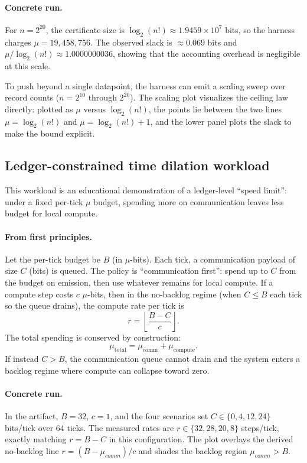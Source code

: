 \paragraph{Concrete run.}
For $n=2^{20}$, the certificate size is $\log_2(n!)\approx 1.9459\times 10^7$ bits, so the harness charges $\mu=19{,}458{,}756$. The observed slack is $\approx 0.069$ bits and $\mu/\log_2(n!)\approx 1.0000000036$, showing that the accounting overhead is negligible at this scale.

To push beyond a single datapoint, the harness can emit a scaling sweep over record counts ($n=2^{10}$ through $2^{20}$). The scaling plot visualizes the ceiling law directly: plotted as $\mu$ versus $\log_2(n!)$, the points lie between the two lines $\mu=\log_2(n!)$ and $\mu=\log_2(n!)+1$, and the lower panel plots the slack to make the bound explicit.


\subsection{Ledger-constrained time dilation workload}
\label{sec:ledger_time_dilation}
This workload is an educational demonstration of a ledger-level ``speed limit'': under a fixed per-tick $\mu$ budget, spending more on communication leaves less budget for local compute.

\paragraph{From first principles.}
Let the per-tick budget be $B$ (in $\mu$-bits). Each tick, a communication payload of size $C$ (bits) is queued. The policy is ``communication first'': spend up to $C$ from the budget on emission, then use whatever remains for local compute. If a compute step costs $c$ $\mu$-bits, then in the no-backlog regime (when $C\le B$ each tick so the queue drains), the compute rate per tick is
\[
r = \left\lfloor\frac{B-C}{c}\right\rfloor.
\]
The total spending is conserved by construction:
\[
\mu_{\text{total}} = \mu_{\text{comm}} + \mu_{\text{compute}}.
\]
If instead $C>B$, the communication queue cannot drain and the system enters a backlog regime where compute can collapse toward zero.

\paragraph{Concrete run.}
In the artifact, $B=32$, $c=1$, and the four scenarios set $C\in\{0,4,12,24\}$ bits/tick over 64 ticks. The measured rates are $r\in\{32,28,20,8\}$ steps/tick, exactly matching $r=B-C$ in this configuration. The plot overlays the derived no-backlog line $r=(B-\mu_{comm})/c$ and shades the backlog region $\mu_{comm}>B$.



